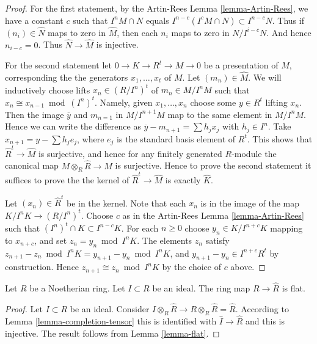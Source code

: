 \begin{proof}
For the first statement, by the Artin-Rees Lemma \ref{lemma-Artin-Rees},
we have a constant $c$ such that $I^nM \cap N$
equals $I^{n-c}(I^cM \cap N) \subset I^{n-c}N$.
Thus if $(n_i) \in \hat N$ maps to zero in
$\hat M$, then each $n_i$ maps to zero in $N/I^{i-c}N$.
And hence $n_{i-c} = 0$. Thus $\hat N \to \hat M$ is injective.

\medskip\noindent
For the second statement let $0\to K \to R^t \to M \to 0$
be a presentation of $M$, corresponding the the generators
$x_1,\ldots,x_t$ of $M$. Let $(m_n) \in \hat M$.
We will inductively choose lifts $x_n \in (R/I^n)^t$ of 
$m_n \in M/I^nM$ such that $x_n \cong x_{n-1} \bmod (I^n)^t$.
Namely, given $x_1,\ldots, x_n$ choose some $y \in R^t$
lifting $x_n$. Then the image $\overline{y}$ and $m_{n=1}$
in $M/I^{n+1}M$ map to the same element in $M/I^nM$. 
Hence we can write the difference as
$\overline{y} - m_{n+1} = \sum h_j x_j$ with
$h_j \in I^n$. Take $x_{n+1} = y - \sum h_j e_j$, where
$e_j$ is the standard basis element of $R^t$.
This shows that $\hat R^t \to \hat M$ is surjective,
and hence for any finitely generated $R$-module the
canonical map $M \otimes_R \hat R \to M$ is surjective.
Hence to prove the second statement it suffices
to prove the the kernel of $\hat R^t \to \hat M$ is
exactly $\hat K$.

\medskip\noindent
Let $(x_n) \in \hat R^t$ be in the kernel. Note that
each $x_n$ is in the image of the map $K/I^nK \to (R/I^n)^t$.
Choose $c$ as in the Artin-Rees
Lemma \ref{lemma-Artin-Rees} such that $(I^n)^t \cap K 
\subset I^{n-c} K$. For each $n \geq 0$ choose 
$y_n \in K/I^{n+c}K$ mapping to $x_{n+c}$, and
set $z_n = y_n \bmod I^nK$. The elements $z_n$ satisfy $z_{n+1} - z_n \bmod I^nK
= y_{n+1} - y_{n} \bmod I^nK$, and $y_{n+1} - y_n \in
I^{n+c}R^t$ by construction. Hence $z_{n+1} \cong z_n \bmod I^nK$
by the choice of $c$ above.
\end{proof}

\begin{lemma}
\label{lemma-completion-flat}
Let $R$ be a Noetherian ring.
Let $I \subset R$ be an ideal.
The ring map $R \to \hat R$ is flat.
\end{lemma}

\begin{proof}
Let $I \subset R$ be an ideal.
Consider $I \otimes_R \hat R \to R\otimes_R \hat R = \hat R$.
According to Lemma \ref{lemma-completion-tensor} this
is identified with $\hat I \to \hat R$ and this is injective.
The result follows from Lemma \ref{lemma-flat}.
\end{proof}

